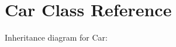 \hypertarget{classCar}{}\section{Car Class Reference}
\label{classCar}


Inheritance diagram for Car\+:
